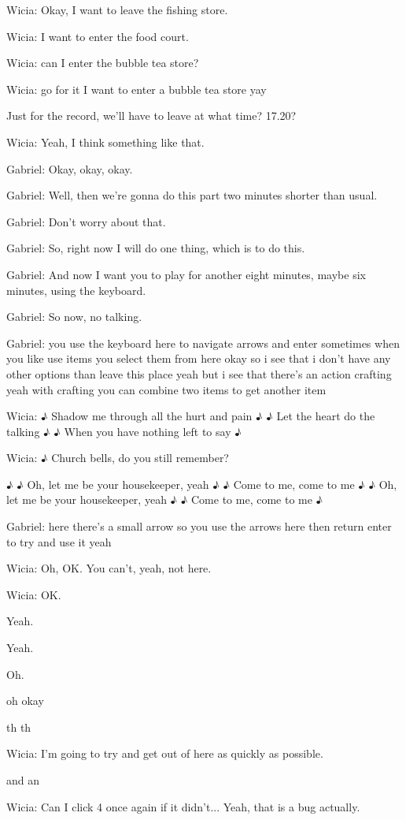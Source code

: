 Wicia: Okay, I want to leave the fishing store.

Wicia: I want to enter the food court.

Wicia: can I enter the bubble tea store?

Wicia: go for it I want to enter a bubble tea store yay

Just for the record, we'll have to leave at what time? 17.20?

Wicia: Yeah, I think something like that.

Gabriel: Okay, okay, okay.

Gabriel: Well, then we're gonna do this part two minutes shorter than usual.

Gabriel: Don't worry about that.

Gabriel: So, right now I will do one thing, which is to do this.

Gabriel: And now I want you to play for another eight minutes, maybe six minutes, using the keyboard.

Gabriel: So now, no talking.

Gabriel: you use the keyboard here to navigate arrows and enter sometimes when you like use items you select them from here okay so i see that i don't have any other options than leave this place yeah but i see that there's an action crafting yeah with crafting you can combine two items to get another item

Wicia: ♪ Shadow me through all the hurt and pain ♪ ♪ Let the heart do the talking ♪ ♪ When you have nothing left to say ♪

Wicia: ♪ Church bells, do you still remember?

♪ ♪ Oh, let me be your housekeeper, yeah ♪ ♪ Come to me, come to me ♪ ♪ Oh, let me be your housekeeper, yeah ♪ ♪ Come to me, come to me ♪

Gabriel: here there's a small arrow so you use the arrows here then return enter to try and use it yeah

Wicia: Oh, OK. You can't, yeah, not here.

Wicia: OK.

Yeah.

Yeah.

Oh.

oh okay

th th

Wicia: I'm going to try and get out of here as quickly as possible.

and an

Wicia: Can I click 4 once again if it didn't... Yeah, that is a bug actually.

